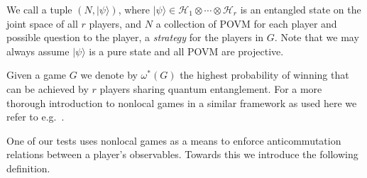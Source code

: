 \documentclass[11pt,letterpaper]{article}
\newcommand{\<}{\langle}
\renewcommand{\>}{\rangle}
\newcommand{\ket}[1]{| #1 \>}
\newcommand{\mH}{\mathcal{H}}
\begin{document}
We call a tuple $(N,\ket{\psi})$, where $\ket{\psi} \in \mH_1\otimes \cdots\otimes \mH_r$ is an entangled state on the joint space of all $r$ players, and $N$ a collection of POVM for each player and possible question to the player, a \emph{strategy} for the players in $G$. Note that we may always assume $\ket{\psi}$ is a pure state and all POVM are projective. 

Given a game $G$ we denote by $\omega^*(G)$ the highest probability of winning that can be achieved by $r$ players sharing quantum entanglement. For a more thorough introduction to nonlocal games in a similar framework as used here we refer to e.g.~\cite{ji2015classical}. 

One of our tests uses nonlocal games as a means to enforce anticommutation relations between a player's observables. Towards this we introduce the following definition. 
\end{document}
